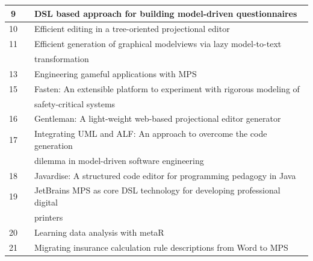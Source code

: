 \begin{table}[htbp]
\begin{center}
\begin{tabular}{ |c  c|l | }
            9   & \cite{furtado2021dsl_SLR}              & DSL based approach for building model-driven questionnaires                 \\ \hline
            10  & \cite{beckmann2020efficient_SLR}       & Efficient editing in a tree-oriented projectional editor                    \\ \hline
            11  & \cite{kolovos2020efficient_SLR}        & Efficient generation of graphical modelviews via lazy model-to-text         \\
                &                                        & transformation                                                              \\ \hline
            13  & \cite{bucchiarone2021engineering_SLR}  & Engineering gameful applications with MPS                                   \\ \hline
            15  & \cite{ratiu2021fasten_SLR}             & Fasten: An extensible platform to experiment with rigorous modeling of      \\
                &                                        & safety-critical systems                                                     \\ \hline
            16  & \cite{lafontant2020gentleman_SLR}      & Gentleman: A light-weight web-based projectional editor generator           \\ \hline
            17  & \cite{schropfer2019integrating_SLR}    & Integrating UML and ALF: An approach to overcome the code generation        \\
                &                                        & dilemma in model-driven software engineering                                \\ \hline
            18  & \cite{santos2020javardise_SLR}         & Javardise: A structured code editor for programming pedagogy in Java        \\ \hline
            19  & \cite{schindler2021jetbrains_SLR}      & JetBrains MPS as core DSL technology for developing professional digital    \\
                &                                        & printers                                                                    \\ \hline
            20  & \cite{simi2021learning_SLR}            & Learning data analysis with metaR                                           \\ \hline
            21  & \cite{stotz2021migrating_SLR}          & Migrating insurance calculation rule descriptions from Word to MPS          \\ \hline

\end{tabular}
\end{center}
\end{table}
